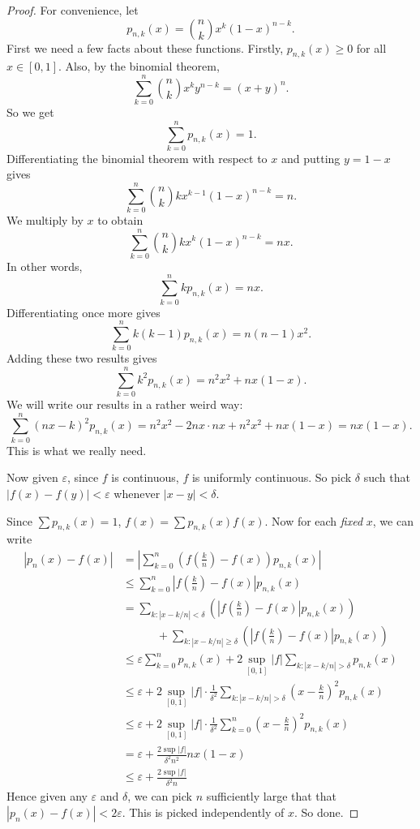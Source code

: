 \documentclass[a4paper]{article}
\begin{document}
\begin{proof}
  For convenience, let
  \[
    p_{n, k}(x) = \binom{n}{k}x^k (1 - x)^{n - k}.
  \]
  First we need a few facts about these functions. Firstly, $p_{n, k}(x) \geq 0$ for all $x\in [0, 1]$. Also, by the binomial theorem,
  \[
    \sum_{k = 0}^n \binom{n}{k}x^k y^{n - k} = (x + y)^n.
  \]
  So we get
  \[
    \sum_{k = 0}^n p_{n, k}(x) = 1.
  \]
  Differentiating the binomial theorem with respect to $x$ and putting $y = 1 - x$ gives
  \[
    \sum_{k = 0}^n \binom{n}{k}k x^{k - 1}(1 - x)^{n - k} = n.
  \]
  We multiply by $x$ to obtain
  \[
    \sum_{k = 0}^n \binom{n}{k}k x^k(1 - x)^{n - k} = nx.
  \]
  In other words,
  \[
    \sum_{k = 0}^n kp_{n, k}(x) = nx.
  \]
  Differentiating once more gives
  \[
    \sum_{k = 0}^n k(k - 1)p_{n, k}(x) = n(n - 1)x^2.
  \]
  Adding these two results gives
  \[
    \sum_{k = 0}^n k^2 p_{n, k}(x) = n^2 x^2 + nx(1 - x).
  \]
  We will write our results in a rather weird way:
  \[
    \sum_{k = 0}^n (nx - k)^2 p_{n, k}(x) = n^2 x^2 - 2nx \cdot nx + n^2 x^2 + nx(1 - x) = nx(1 - x).\tag{$*$}
  \]
  This is what we really need.

  Now given $\varepsilon$, since $f$ is continuous, $f$ is uniformly continuous. So pick $\delta$ such that $|f(x) - f(y)| < \varepsilon$ whenever $|x - y| < \delta$.

  Since $\sum p_{n, k}(x) = 1$, $f(x) = \sum p_{n, k}(x) f(x)$. Now for each \emph{fixed} $x$, we can write
  \begin{align*}
    |p_n(x) - f(x)| &= \left|\sum_{k = 0}^n \left(f\left(\frac{k}{n}\right) - f(x)\right) p_{n, k}(x)\right|\\
    &\leq \sum_{k = 0}^n \left|f\left(\frac{k}{n}\right) - f(x)\right| p_{n, k}(x)\\
    &= \sum_{k: |x - k/n| < \delta}\left(\left|f\left(\frac{k}{n}\right) - f(x)\right| p_{n, k}(x)\right) \\
    &\quad\quad\quad+ \sum_{k: |x - k/n| \geq \delta}\left(\left|f\left(\frac{k}{n}\right) - f(x)\right| p_{n, k}(x)\right)\\
    &\leq \varepsilon \sum_{k = 0}^n p_{n, k}(x) + 2\sup_{[0, 1]} |f| \sum_{k: |x - k/n| > \delta} p_{n, k}(x)\\
    &\leq \varepsilon + 2\sup_{[0, 1]} |f|\cdot \frac{1}{\delta^2}\sum_{k: |x - k/n| > \delta} \left(x - \frac{k}{n}\right)^2 p_{n, k}(x)\\
    &\leq \varepsilon + 2\sup_{[0, 1]} |f|\cdot \frac{1}{\delta^2}\sum_{k = 0}^n \left(x - \frac{k}{n}\right)^2 p_{n, k}(x)\\
    &= \varepsilon + \frac{2\sup|f|}{\delta^2 n^2} nx(1 - x)\\
    &\leq \varepsilon + \frac{2\sup|f|}{\delta^2 n}
  \end{align*}
  Hence given any $\varepsilon$ and $\delta$, we can pick $n$ sufficiently large that that $|p_n(x) - f(x)| < 2\varepsilon$. This is picked independently of $x$. So done.
\end{proof}
\end{document}
